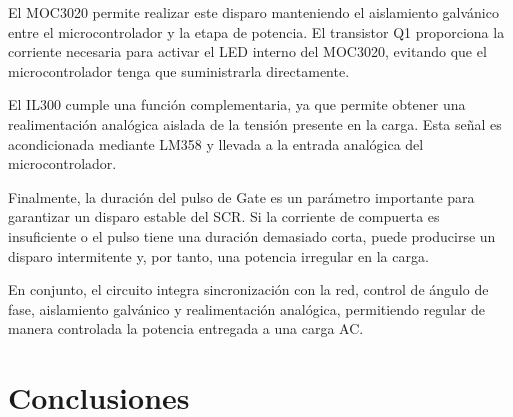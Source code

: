 \documentclass[12pt]{article}
\begin{document}
El MOC3020 permite realizar este disparo manteniendo el aislamiento
galvánico entre el microcontrolador y la etapa de potencia. El transistor
Q1 proporciona la corriente necesaria para activar el LED interno del
MOC3020, evitando que el microcontrolador tenga que suministrarla
directamente.

El IL300 cumple una función complementaria, ya que permite obtener una
realimentación analógica aislada de la tensión presente en la carga. Esta
señal es acondicionada mediante LM358 y llevada a la entrada analógica del
microcontrolador.

Finalmente, la duración del pulso de Gate es un parámetro importante para
garantizar un disparo estable del SCR. Si la corriente de compuerta es
insuficiente o el pulso tiene una duración demasiado corta, puede producirse
un disparo intermitente y, por tanto, una potencia irregular en la carga.

En conjunto, el circuito integra sincronización con la red, control de
ángulo de fase, aislamiento galvánico y realimentación analógica, permitiendo
regular de manera controlada la potencia entregada a una carga AC.


\section{Conclusiones}
\end{document}
